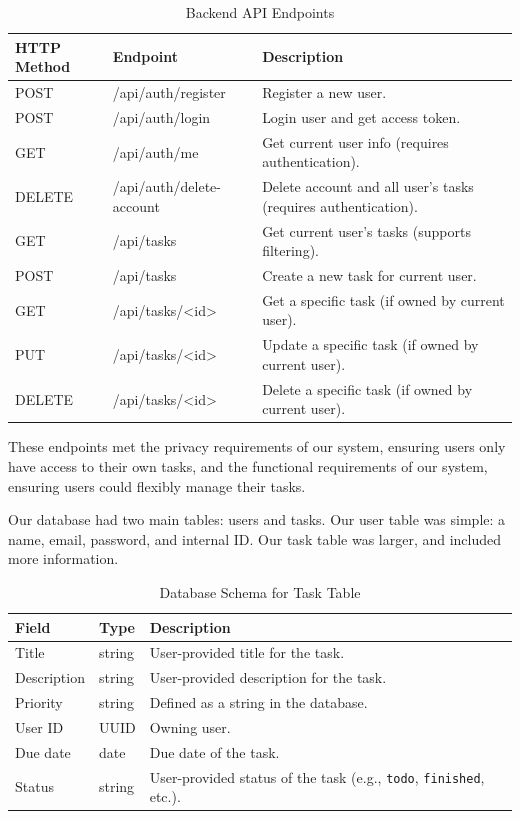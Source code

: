 \documentclass[11pt,oneside]{article}
\begin{document}
\begin{table}[H]
    \centering
    \caption{Backend API Endpoints}
    \label{tab:api-endpoints}
    \begin{tabular}{l l p{8cm}}
        \toprule
        \textbf{HTTP Method} & \textbf{Endpoint} & \textbf{Description} \\
        \midrule
        POST & /api/auth/register & Register a new user. \\
        POST & /api/auth/login & Login user and get access token. \\
        GET & /api/auth/me & Get current user info (requires authentication). \\
        DELETE & /api/auth/delete-account & Delete account and all user's tasks (requires authentication). \\
        GET & /api/tasks & Get current user's tasks (supports filtering). \\
        POST & /api/tasks & Create a new task for current user. \\
        GET & /api/tasks/\textless id\textgreater & Get a specific task (if owned by current user). \\
        PUT & /api/tasks/\textless id\textgreater & Update a specific task (if owned by current user). \\
        DELETE & /api/tasks/\textless id\textgreater & Delete a specific task (if owned by current user). \\
        \bottomrule
    \end{tabular}
\end{table}

These endpoints met the privacy requirements of our system, ensuring users only have access to their own tasks, and the functional requirements of our system, ensuring users could flexibly manage their tasks.

Our database had two main tables: users and tasks. Our user table was simple: a name, email, password, and internal ID. Our task table was larger, and included more information.

\begin{table}[H]
    \centering
    \caption{Database Schema for Task Table}
    \label{tab:database-schema}
    \begin{tabular}{l l p{8cm}}
        \toprule
        \textbf{Field} & \textbf{Type} & \textbf{Description} \\
        \midrule
        Title & string & User-provided title for the task. \\
        Description & string & User-provided description for the task. \\
        Priority & string & Defined as a string in the database. \\
        User ID & UUID & Owning user. \\
        Due date & date & Due date of the task. \\
        Status & string & User-provided status of the task (e.g., \texttt{todo}, \texttt{finished}, etc.). \\
        \bottomrule
    \end{tabular}
\end{table}
\end{document}
